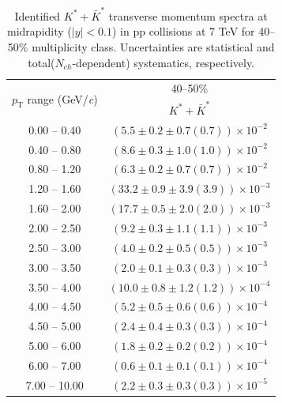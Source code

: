 \begin{table}
\caption{Identified $K^{*} + \bar{K}^{*}$ transverse momentum spectra at midrapidity ($|y|<0.1$) in pp collisions at 7 TeV for 40--50\% multiplicity class. Uncertainties are statistical and total($N_{ch}$-dependent) systematics, respectively.}
\label{tab:KStar_40to50}
\begin{center}
\begin{tabular}{ c | c }
\hline
\multirow{2}{*}{$p_{\mathrm{T}}$ range (GeV/\textit{c})} & \multicolumn{1}{c}{40--50\%} \\ & $K^{*} + \bar{K}^{*}$\\ 
\hline
0.00 -- 0.40 & $(5.5\pm0.2\pm0.7(0.7))\times10^{-2}$ \\ 
0.40 -- 0.80 & $(8.6\pm0.3\pm1.0(1.0))\times10^{-2}$ \\ 
0.80 -- 1.20 & $(6.3\pm0.2\pm0.7(0.7))\times10^{-2}$ \\ 
1.20 -- 1.60 & $(33.2\pm0.9\pm3.9(3.9))\times10^{-3}$ \\ 
1.60 -- 2.00 & $(17.7\pm0.5\pm2.0(2.0))\times10^{-3}$ \\ 
2.00 -- 2.50 & $(9.2\pm0.3\pm1.1(1.1))\times10^{-3}$ \\ 
2.50 -- 3.00 & $(4.0\pm0.2\pm0.5(0.5))\times10^{-3}$ \\ 
3.00 -- 3.50 & $(2.0\pm0.1\pm0.3(0.3))\times10^{-3}$ \\ 
3.50 -- 4.00 & $(10.0\pm0.8\pm1.2(1.2))\times10^{-4}$ \\ 
4.00 -- 4.50 & $(5.2\pm0.5\pm0.6(0.6))\times10^{-4}$ \\ 
4.50 -- 5.00 & $(2.4\pm0.4\pm0.3(0.3))\times10^{-4}$ \\ 
5.00 -- 6.00 & $(1.8\pm0.2\pm0.2(0.2))\times10^{-4}$ \\ 
6.00 -- 7.00 & $(0.6\pm0.1\pm0.1(0.1))\times10^{-4}$ \\ 
7.00 -- 10.00 & $(2.2\pm0.3\pm0.3(0.3))\times10^{-5}$ \\ 
\hline
\end{tabular}
\end{center}
\end{table}
 
